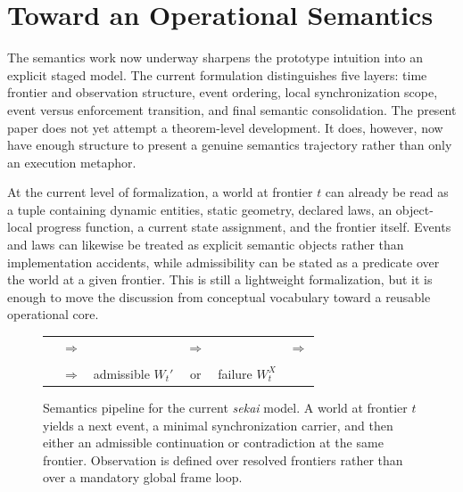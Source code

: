 \documentclass[sigplan,review,anonymous]{acmart}
\begin{document}
\section{Toward an Operational Semantics}

The semantics work now underway sharpens the prototype intuition into an explicit staged model.
The current formulation distinguishes five layers:
time frontier and observation structure, event ordering, local synchronization scope, event versus enforcement transition, and final semantic consolidation.
The present paper does not yet attempt a theorem-level development.
It does, however, now have enough structure to present a genuine semantics trajectory rather than only an execution metaphor.

At the current level of formalization, a world at frontier $t$ can already be read as a tuple containing dynamic entities, static geometry, declared laws, an object-local progress function, a current state assignment, and the frontier itself.
Events and laws can likewise be treated as explicit semantic objects rather than implementation accidents, while admissibility can be stated as a predicate over the world at a given frontier.
This is still a lightweight formalization, but it is enough to move the discussion from conceptual vocabulary toward a reusable operational core.

\begin{figure}[t]
  \centering
  \small
  \setlength{\tabcolsep}{3pt}
  \renewcommand{\arraystretch}{1.15}
  \begin{tabular}{c c c c c c}
    \fbox{\parbox[c][1.8em][c]{0.10\columnwidth}{\centering $W_t$}} &
    $\Rightarrow$ &
    \fbox{\parbox[c][1.8em][c]{0.16\columnwidth}{\centering $ev = Next(W_t)$}} &
    $\Rightarrow$ &
    \fbox{\parbox[c][1.8em][c]{0.15\columnwidth}{\centering $Sync(ev)$}} &
    $\Rightarrow$ \\
    \multicolumn{6}{c}{} \\
    \fbox{\parbox[c][1.8em][c]{0.15\columnwidth}{\centering $W_t^{ev}$}} &
    $\Rightarrow$ &
    \fbox{\parbox[c][2.8em][c]{0.16\columnwidth}{\centering admissible\\ $W_t'$}} &
    \multicolumn{1}{c}{or} &
    \fbox{\parbox[c][2.8em][c]{0.14\columnwidth}{\centering failure\\ $W_t^{X}$}} &
    \\
  \end{tabular}

  \vspace{0.4em}

  \caption{Semantics pipeline for the current \emph{sekai} model. A world at frontier $t$ yields a next event, a minimal synchronization carrier, and then either an admissible continuation or contradiction at the same frontier. Observation is defined over resolved frontiers rather than over a mandatory global frame loop.}
  \label{fig:semantics-pipeline}
\end{figure}
\end{document}
